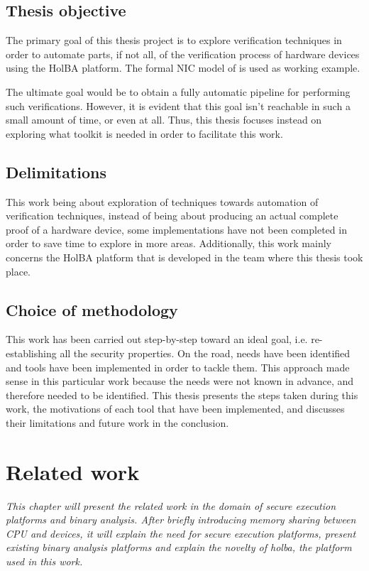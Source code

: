 \documentclass{kththesis}
\begin{document}
\section{Thesis objective}

The primary goal of this thesis project is to explore verification techniques in order to automate parts, if not all, of the verification process of hardware devices using the HolBA platform. The formal \gls{NIC} model of \cite{haglund_formal_2016} is used as working example.

The ultimate goal would be to obtain a fully automatic pipeline for performing such verifications. However, it is evident that this goal isn't reachable in such a small amount of time, or even at all. Thus, this thesis focuses instead on exploring what toolkit is needed in order to facilitate this work.

\section{Delimitations}

This work being about exploration of techniques towards automation of verification techniques, instead of being about producing an actual complete proof of a hardware device, some implementations have not been completed in order to save time to explore in more areas. Additionally, this work mainly concerns the HolBA platform that is developed in the team where this thesis took place.

\section{Choice of methodology}

This work has been carried out step-by-step toward an ideal goal, i.e. re-establishing all the security properties. On the road, needs have been identified and tools have been implemented in order to tackle them. This approach made sense in this particular work because the needs were not known in advance, and therefore needed to be identified. This thesis presents the steps taken during this work, the motivations of each tool that have been implemented, and discusses their limitations and future work in the conclusion.

\chapter{Related work} \label{related-work}
\vspace{-1cm}
\textit{This chapter will present the related work in the domain of secure execution platforms and binary analysis. After briefly introducing memory sharing between \gls{CPU} and devices, it will explain the need for secure execution platforms, present existing binary analysis platforms and explain the novelty of \gls{holba}, the platform used in this work.}
\end{document}

